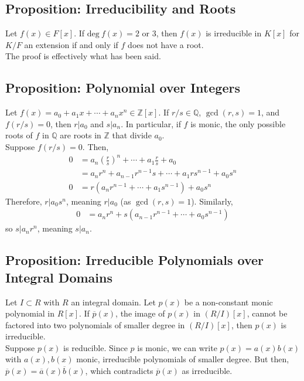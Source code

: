 \documentclass[8pt]{extarticle}
\newcommand{\Q}{\mathbb{Q}}
\newcommand{\Z}{\mathbb{Z}}
\begin{document}
  \subsection{Proposition: Irreducibility and Roots}%
  Let $f(x)\in F[x]$. If $\text{deg}~f(x) = 2 $ or $3$, then $f(x)$ is irreducible in $K[x]$ for $K/F$ an extension if and only if $f$ does not have a root.\\

  The proof is effectively what has been said.
  \subsection{Proposition: Polynomial over Integers}%
  Let $f(x) = a_0 + a_1x + \cdots + a_nx^n \in \Z[x]$. If $r/s \in \Q$, $\gcd(r,s) = 1$, and $f(r/s) = 0$, then $r | a_0$ and $s | a_n$. In particular, if $f$ is monic, the only possible roots of $f$ in $\Q$ are roots in $\Z$ that divide $a_0$.\\

  Suppose $f(r/s) = 0$. Then,
  \begin{align*}
    0 &= a_n \left(\frac{r}{s}\right)^n + \cdots + a_1 \frac{r}{s} + a_0\\
      &= a_nr^n + a_{n-1}r^{n-1}s + \cdots + a_1rs^{n-1} + a_0s^n\\
    0 &= r\left(a_nr^{n-1} + \cdots + a_1s^{n-1}\right) + a_0s^{n}
  \end{align*}
  Therefore, $r|a_0 s^{n}$, meaning $r|a_0$ (as $\gcd(r,s) = 1$). Similarly,
  \begin{align*}
    0 &= a_nr^{n} + s\left(a_{n-1}r^{n-1} + \cdots + a_0s^{n-1}\right)
  \end{align*}
  so $s|a_nr^n$, meaning $s|a_n$.
  \subsection{Proposition: Irreducible Polynomials over Integral Domains}%
  Let $I\subset R$ with $R$ an integral domain. Let $p(x)$ be a non-constant monic polynomial in $R[x]$. If $\overline{p}(x)$, the image of $p(x)$ in $(R/I)[x]$, cannot be factored into two polynomials of smaller degree in $(R/I)[x]$, then $p(x)$ is irreducible.\\

  Suppose $p(x)$ is reducible. Since $p$ is monic, we can write $p(x) = a(x)b(x)$ with $a(x),b(x)$ monic, irreducible polynomials of smaller degree. But then, $\overline{p}(x) = \overline{a}(x) \overline{b}(x)$, which contradicts $\overline{p}(x)$ as irreducible.
\end{document}
